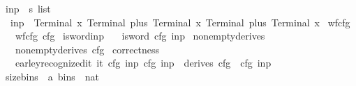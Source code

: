 \begin{isabellebody}
\isanewline
{}\isamarkupfalse%
\ inp{}\ {\isacharcolon}{\kern0pt}{\isacharcolon}{\kern0pt}\ {\isachardoublequoteopen}s{}\ list{\isachardoublequoteclose}\ \isanewline
\ \ {\isachardoublequoteopen}inp{}\ {\isacharequal}{\kern0pt}\ {\isacharbrackleft}{\kern0pt}Terminal\ x{\isacharcomma}{\kern0pt}\ Terminal\ plus{\isacharcomma}{\kern0pt}\ Terminal\ x{\isacharcomma}{\kern0pt}\ Terminal\ plus{\isacharcomma}{\kern0pt}\ Terminal\ x{\isacharbrackright}{\kern0pt}{\isachardoublequoteclose}\isanewline
\isanewline
{}\isamarkupfalse%
\ wf{\isacharunderscore}{\kern0pt}cfg{}{\isacharcolon}{\kern0pt}\isanewline
\ \ \ {\isachardoublequoteopen}wf{\isacharunderscore}{\kern0pt}cfg\ cfg{}{\isachardoublequoteclose}%
\isadelimproof
%
\endisadelimproof
%
\isatagproof
%
\endisatagproof
{\isafoldproof}%
%
\isadelimproof
\isanewline
%
\endisadelimproof
{}\isamarkupfalse%
\ is{\isacharunderscore}{\kern0pt}word{\isacharunderscore}{\kern0pt}inp{}{\isacharcolon}{\kern0pt}\isanewline
\ \ \ {\isachardoublequoteopen}is{\isacharunderscore}{\kern0pt}word\ cfg{}\ inp{}{\isachardoublequoteclose}%
\isadelimproof
%
\endisadelimproof
%
\isatagproof
%
\endisatagproof
{\isafoldproof}%
%
\isadelimproof
\isanewline
%
\endisadelimproof
{}\isamarkupfalse%
\ nonempty{\isacharunderscore}{\kern0pt}derives{}{\isacharcolon}{\kern0pt}\isanewline
\ \ \ {\isachardoublequoteopen}nonempty{\isacharunderscore}{\kern0pt}derives\ cfg{}{\isachardoublequoteclose}%
\isadelimproof
%
\endisadelimproof
%
\isatagproof
%
\endisatagproof
{\isafoldproof}%
%
\isadelimproof
\isanewline
%
\endisadelimproof
{}\isamarkupfalse%
\ correctness{}{\isacharcolon}{\kern0pt}\isanewline
\ \ \ {\isachardoublequoteopen}earley{\isacharunderscore}{\kern0pt}recognized{\isacharunderscore}{\kern0pt}it\ {\isacharparenleft}{\kern0pt}{\isasymII}{\isacharunderscore}{\kern0pt}it\ cfg{}\ inp{}{\isacharparenright}{\kern0pt}\ cfg{}\ inp{}\ {\isasymlongleftrightarrow}\ derives\ cfg{}\ {\isacharbrackleft}{\kern0pt}{\isasymSS}\ cfg{}{\isacharbrackright}{\kern0pt}\ inp{}{\isachardoublequoteclose}%
\isadelimproof
%
\endisadelimproof
%
\isatagproof
%
\endisatagproof
{\isafoldproof}%
%
\isadelimproof
\isanewline
%
\endisadelimproof
{}\isamarkupfalse%
\ size{\isacharunderscore}{\kern0pt}bins\ {\isacharcolon}{\kern0pt}{\isacharcolon}{\kern0pt}\ {\isachardoublequoteopen}{\isacharprime}{\kern0pt}a\ bins\ {\isasymRightarrow}\ nat{\isachardoublequoteclose}\ \isanewline

\end{isabellebody}
